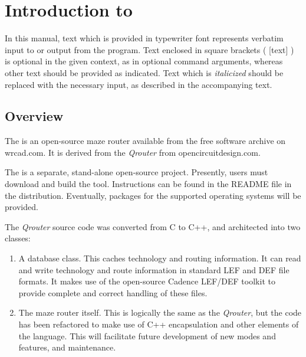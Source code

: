
\chapter{Introduction to {\MRouter}}

In this manual, text which is provided in {\vt typewriter} font
represents verbatim input to or output from the program.  Text
enclosed in square brackets ( [text] ) is optional in the given
context, as in optional command arguments, whereas other text should
be provided as indicated.  Text which is {\it italicized\/} should be
replaced with the necessary input, as described in the accompanying
text.

\section{{\MRouter} Overview}

The {\MRouter} is an open-source maze router available from the free
software archive on {\vt wrcad.com}.  It is derived from the {\it
Qrouter} from {\vt opencircuitdesign.com}.

The {\MRouter} is a separate, stand-alone open-source project. 
Presently, users must download and build the {\MRouter} tool. 
Instructions can be found in the README file in the distribution. 
Eventually, packages for the supported operating systems will be
provided.

The {\it Qrouter} source code was converted from C to C++, and
architected into two classes:

\begin{enumerate}
\item{A database class.  This caches technology and routing
information.  It can read and write technology and route information
in standard LEF and DEF file formats.  It makes use of the open-source
Cadence LEF/DEF toolkit to provide complete and correct handling of
these files.}

\item{The maze router itself.  This is logically the same as the
{\it Qrouter}, but the code has been refactored to make use of C++
encapsulation and other elements of the language.  This will
facilitate future development of new modes and features, and
maintenance.}
\end{enumerate}

